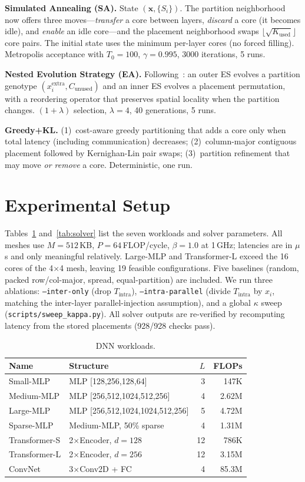 \documentclass[conference]{IEEEtran}
\begin{document}
\textbf{Simulated Annealing (SA).} State $(\mathbf{x},\{S_i\})$. The partition neighborhood now offers three moves---\emph{transfer} a core between layers, \emph{discard} a core (it becomes idle), and \emph{enable} an idle core---and the placement neighborhood swaps $\lfloor\sqrt{K_{\text{used}}}\rfloor$ core pairs. The initial state uses the minimum per-layer cores (no forced filling). Metropolis acceptance with $T_0{=}100$, $\gamma{=}0.995$, 3000 iterations, 5 runs.

\textbf{Nested Evolution Strategy (EA).} Following~\cite{wever2026}: an outer ES evolves a partition genotype $(x_i^{\text{extra}},C_{\text{unused}})$ and an inner ES evolves a placement permutation, with a reordering operator that preserves spatial locality when the partition changes. $(1{+}\lambda)$ selection, $\lambda{=}4$, 40 generations, 5 runs.

\textbf{Greedy+KL.} (1)~cost-aware greedy partitioning that adds a core only when total latency (including communication) decreases; (2)~column-major contiguous placement followed by Kernighan-Lin pair swaps; (3)~partition refinement that may move \emph{or remove} a core. Deterministic, one run.

\section{Experimental Setup}
Tables~\ref{tab:work} and~\ref{tab:solver} list the seven workloads and solver parameters. All meshes use $M{=}512$\,KB, $P{=}64$\,FLOP/cycle, $\beta{=}1.0$ at 1\,GHz; latencies are in $\mu$s and only meaningful relatively. Large-MLP and Transformer-L exceed the 16 cores of the 4$\times$4 mesh, leaving 19 feasible configurations. Five baselines (random, packed row/col-major, spread, equal-partition) are included. We run three ablations: \texttt{--inter-only} (drop $T_{\text{intra}}$), \texttt{--intra-parallel} (divide $T_{\text{intra}}$ by $x_i$, matching the inter-layer parallel-injection assumption), and a global $\kappa$ sweep (\texttt{scripts/sweep\_kappa.py}). All solver outputs are re-verified by recomputing latency from the stored placements (928/928 checks pass).

\begin{table}[t]
\centering
\caption{DNN workloads.}
\label{tab:work}
\footnotesize
\setlength{\tabcolsep}{3pt}
\begin{tabular}{llrr}
\toprule
Name & Structure & $L$ & FLOPs \\
\midrule
Small-MLP & MLP [128,256,128,64] & 3 & 147K \\
Medium-MLP & MLP [256,512,1024,512,256] & 4 & 2.62M \\
Large-MLP & MLP [256,512,1024,1024,512,256] & 5 & 4.72M \\
Sparse-MLP & Medium-MLP, 50\% sparse & 4 & 1.31M \\
Transformer-S & 2$\times$Encoder, $d{=}128$ & 12 & 786K \\
Transformer-L & 2$\times$Encoder, $d{=}256$ & 12 & 3.15M \\
ConvNet & 3$\times$Conv2D + FC & 4 & 85.3M \\
\bottomrule
\end{tabular}
\end{table}
\end{document}
